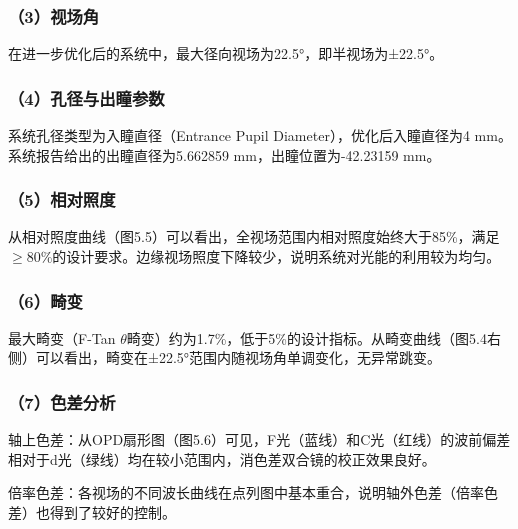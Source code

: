 \subsubsection{（3）视场角}

在进一步优化后的系统中，最大径向视场为22.5°，即半视场为±22.5°。

\subsubsection{（4）孔径与出瞳参数}

系统孔径类型为入瞳直径（Entrance Pupil Diameter），优化后入瞳直径为4 mm。系统报告给出的出瞳直径为5.662859 mm，出瞳位置为-42.23159 mm。

\subsubsection{（5）相对照度}

从相对照度曲线（图5.5）可以看出，全视场范围内相对照度始终大于85\%，满足\(\ge\)80\%的设计要求。边缘视场照度下降较少，说明系统对光能的利用较为均匀。

\subsubsection{（6）畸变}

最大畸变（F-Tan \(\theta\)畸变）约为1.7\%，低于5\%的设计指标。从畸变曲线（图5.4右侧）可以看出，畸变在±22.5°范围内随视场角单调变化，无异常跳变。

\subsubsection{（7）色差分析}

轴上色差：从OPD扇形图（图5.6）可见，F光（蓝线）和C光（红线）的波前偏差相对于d光（绿线）均在较小范围内，消色差双合镜的校正效果良好。

倍率色差：各视场的不同波长曲线在点列图中基本重合，说明轴外色差（倍率色差）也得到了较好的控制。

